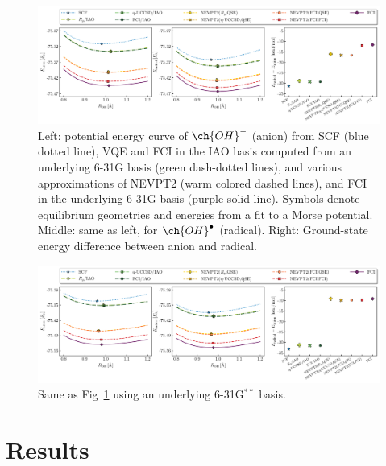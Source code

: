 \documentclass[aps,pra,twocolumn]{revtex4-2}
\newcommand{\OHradical}{\ch{OH}^\bullet}
\newcommand{\OHanion}{\ch{OH}^-}
\begin{document}

\begin{figure}[t!]
\includegraphics[width=\textwidth]{../nevpt2/6-31g/fig.pdf}
\caption{Left: potential energy curve of $\OHanion$ (anion)
from SCF (blue dotted line),
VQE and FCI in the IAO basis computed from an underlying 6-31G basis (green dash-dotted lines),
and various approximations of NEVPT2 (warm colored dashed lines), and FCI in the underlying 6-31G basis (purple solid line).
Symbols denote equilibrium geometries and energies from a fit to a Morse potential.
Middle: same as left, for $\OHradical$ (radical).
Right: Ground-state energy difference between anion and radical.}
\label{figure:631g}
\end{figure}

\begin{figure}[t!]
\includegraphics[width=\textwidth]{../nevpt2/6-31gss/fig.pdf}
\caption{Same as Fig~\ref{figure:631g} using an underlying 6-31G${}^{**}$ basis.}
\label{figure:631gss}
\end{figure}

\section{Results}
\label{sec:results}
\end{document}
